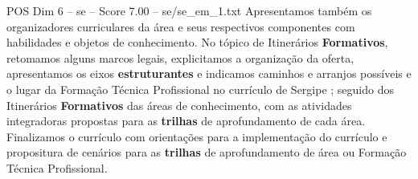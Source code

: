 \begin{textsample}{POS Dim 6 – se – Score 7.00 – se/se\_em\_1.txt}
Apresentamos também os organizadores curriculares da área e seus respectivos componentes com habilidades e objetos de conhecimento.
No tópico de Itinerários \textbf{Formativos}, retomamos alguns marcos legais, explicitamos a organização da oferta, apresentamos os eixos \textbf{estruturantes} e indicamos caminhos e arranjos possíveis e o lugar da Formação Técnica Profissional no currículo de Sergipe ; seguido dos Itinerários \textbf{Formativos} das áreas de conhecimento, com as atividades integradoras propostas para as \textbf{trilhas} de aprofundamento de cada área.
Finalizamos o currículo com orientações para a implementação do currículo e propositura de cenários para as \textbf{trilhas} de aprofundamento de área ou Formação Técnica Profissional.

\end{textsample}
